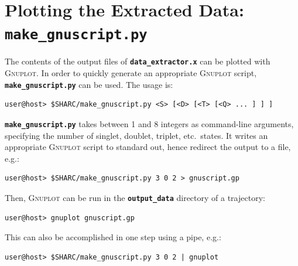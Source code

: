 \documentclass[a4paper,10pt,DIV=15,openany]{scrbook}
\newcommand{\ttt}[1]{\textbf{\texttt{#1}}}
\begin{document}
\section{Plotting the Extracted Data: \ttt{make\_gnuscript.py}}\label{sec:make_gnuscript.py}

The contents of the output files of \ttt{data\_extractor.x} can be plotted with \textsc{Gnuplot}. In order to quickly generate an appropriate \textsc{Gnuplot} script, \ttt{make\_gnuscript.py} can be used. The usage is:
\begin{verbatim}
user@host> $SHARC/make_gnuscript.py <S> [<D> [<T> [<Q> ... ] ] ]
\end{verbatim}
\ttt{make\_gnuscript.py} takes between 1 and 8 integers as command-line arguments, specifying the number of singlet, doublet, triplet, etc.\ states. It writes an appropriate \textsc{Gnuplot} script to standard out, hence redirect the output to a file, e.g.:
\begin{verbatim}
user@host> $SHARC/make_gnuscript.py 3 0 2 > gnuscript.gp
\end{verbatim}


Then, \textsc{Gnuplot} can be run in the \ttt{output\_data} directory of a trajectory:
\begin{verbatim}
user@host> gnuplot gnuscript.gp
\end{verbatim}
This can also be accomplished in one step using a pipe, e.g.:
\begin{verbatim}
user@host> $SHARC/make_gnuscript.py 3 0 2 | gnuplot
\end{verbatim}
\end{document}
